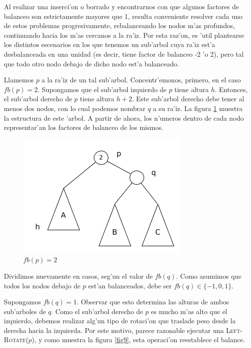 Al realizar una inserci'on o borrado y encontrarnos con que algunos factores de balanceo son estrictamente mayores que 1, resulta conveniente resolver cada uno de estos problemas progresivamente, rebalanceando los nodos m'as profundos, continuando hacia los m'as cercanos a la ra'iz. Por esta raz'on, es 'util plantearse los distintos escenarios en los que tenemos un sub'arbol cuya ra'iz est'a desbalanceada en una unidad (es decir, tiene factor de balanceo -2 'o 2), pero tal que todo otro nodo debajo de dicho nodo est'a balanceado.

Llamemos $p$ a la ra'iz de un tal sub'arbol. Concentr'emonos, primero, en el caso $fb(p) = 2$. Supongamos que el sub'arbol izquierdo de $p$ tiene altura $h$. Entonces, el sub'arbol derecho de $p$ tiene altura $h + 2$. Este sub'arbol derecho debe tener al menos dos nodos, con lo cual podemos nombrar $q$ a su ra'iz. La figura \ref{fig8} muestra la estructura de este 'arbol. A partir de ahora, los n'umeros dentro de cada nodo representar'an los factores de balanceo de los mismos.

\begin{figure}[H]
	\begin{center}
		\includegraphics[scale=0.6]{imagenes/fig8.jpg}
	\end{center}
	\caption{$fb(p) = 2$}
	\label{fig8}
\end{figure}

Dividimos nuevamente en casos, seg'un el valor de $fb(q)$. Como asumimos que todos los nodos debajo de $p$ est'an balanceados, debe ser $fb(q) \in \{-1, 0, 1\}$.

Supongamos $fb(q) = 1$. Observar que esto determina las alturas de ambos sub'arboles de $q$. Como el sub'arbol derecho de $p$ es mucho m'as alto que el izquierdo, debemos realizar alg'un tipo de rotaci'on que traslade peso desde la derecha hacia la izquierda. Por este motivo, parece razonable ejecutar una \textsc{Left-Rotate}($p$), y como muestra la figura \ref{fig9}, esta operaci'on reestablece el balance.

